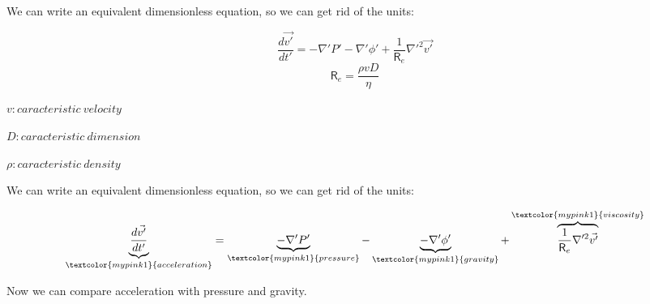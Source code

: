 \documentclass[]{beamer}
\begin{document}

  


  
\begin{frame}
  We can write an equivalent dimensionless equation, so we can get rid of the units:
   
     \begin{equation*}
    \frac{d\vec{v'}}{dt'}=-\nabla' P' -\nabla' \phi' +\frac{1}{\mathsf{R}_e} \nabla'^2 \vec{v'}
       \end{equation*}
   \pause
   \begin{equation*}
  \boxed{\mathsf{R}_e=\frac{\rho v D}{\eta}}
       \end{equation*}
  \pause
  \vspace{2mm}
  
  $v:caracteristic~velocity$
  
  $D:caracteristic~dimension$
  
   $\rho:caracteristic~density$
  
     \end{frame}


  
\begin{frame}
  We can write an equivalent dimensionless equation, so we can get rid of the units:
   
     \begin{equation*}
      \underbrace{ \frac{d\vec{v'}}{dt'}}_{\textcolor{mypink1}{acceleration}}=      \underbrace{-\nabla' P'}_{\textcolor{mypink1}{pressure}} -\underbrace{-\nabla' \phi'}_{\textcolor{mypink1}{gravity}}+ \overbrace{\frac{1}{\mathsf{R}_e} \nabla'^2 \vec{v'}}^{\textcolor{mypink1}{viscosity}}
       \end{equation*}

\vspace{5mm}
\pause

\textcolor{mypink1}{Now we can compare acceleration with pressure and gravity.}
  
     \end{frame}

          


  
\end{document}
